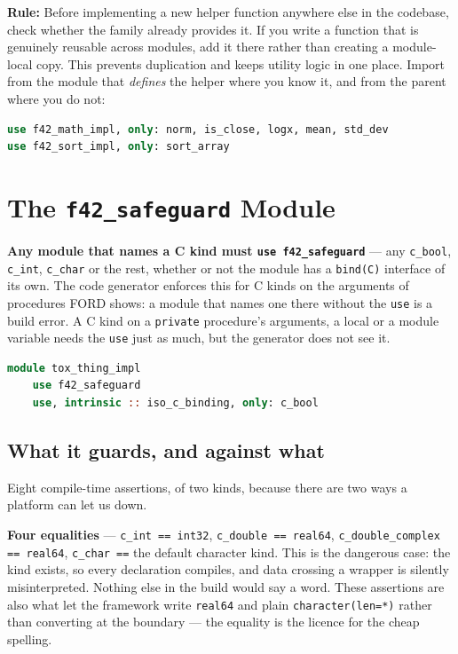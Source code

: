 \documentclass{article}
\begin{document}
\textbf{Rule:} Before implementing a new helper function anywhere else in the codebase, check whether
the family already provides it. If you write a function that is genuinely reusable across modules,
add it there rather than creating a module-local copy. This prevents duplication and keeps utility
logic in one place. Import from the module that \emph{defines} the helper where you know it, and
from the parent where you do not:

\begin{lstlisting}[language=Fortran]
use f42_math_impl, only: norm, is_close, logx, mean, std_dev
use f42_sort_impl, only: sort_array
\end{lstlisting}

\section{The \texttt{f42\_safeguard} Module}

\textbf{Any module that names a C kind must \texttt{use f42\_safeguard}} --- any
\texttt{c\_bool}, \texttt{c\_int}, \texttt{c\_char} or the rest, whether or not the module has a
\texttt{bind(C)} interface of its own. The code generator enforces this for C kinds on the arguments
of procedures FORD shows: a module that names one there without the \texttt{use} is a build error.
A C kind on a \texttt{private} procedure's arguments, a local or a module variable needs the
\texttt{use} just as much, but the generator does not see it.

\begin{lstlisting}[language=Fortran]
module tox_thing_impl
    use f42_safeguard
    use, intrinsic :: iso_c_binding, only: c_bool
\end{lstlisting}

\subsection{What it guards, and against what}

Eight compile-time assertions, of two kinds, because there are two ways a platform can let us
down.

\textbf{Four equalities} --- \texttt{c\_int == int32}, \texttt{c\_double == real64},
\texttt{c\_double\_complex == real64}, \texttt{c\_char ==} the default character kind. This is
the dangerous case: the kind exists, so every declaration compiles, and data crossing a wrapper
is silently misinterpreted. Nothing else in the build would say a word. These assertions are
also what let the framework write \texttt{real64} and plain \texttt{character(len=*)} rather than
converting at the boundary --- the equality is the licence for the cheap spelling.
\end{document}
